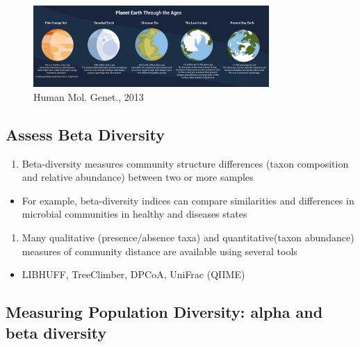 \documentclass[
]{book}
\providecommand{\tightlist}{%
  \setlength{\itemsep}{0pt}\setlength{\parskip}{0pt}}
\begin{document}
\begin{figure}
\centering
\includegraphics[width=0.8\textwidth,height=\textheight]{./Figures/Planets.png}
\caption{Human Mol. Genet., 2013}
\end{figure}

\hypertarget{assess-beta-diversity}{%
\subsection{Assess Beta Diversity}\label{assess-beta-diversity}}

\begin{enumerate}
\def\labelenumi{\arabic{enumi}.}
\tightlist
\item
  Beta-diversity measures community structure differences (taxon composition and relative abundance) between two or more samples
\end{enumerate}

\begin{itemize}
\tightlist
\item
  For example, beta-diversity indices can compare similarities and differences in microbial communities in healthy and diseases states
\end{itemize}

\begin{enumerate}
\def\labelenumi{\arabic{enumi}.}
\setcounter{enumi}{1}
\tightlist
\item
  Many qualitative (presence/absence taxa) and
  quantitative(taxon abundance) measures of community
  distance are available using several tools
\end{enumerate}

\begin{itemize}
\tightlist
\item
  LIBHUFF, TreeClimber, DPCoA, UniFrac (QIIME)
\end{itemize}

\hypertarget{measuring-population-diversity-alpha-and-beta-diversity}{%
\subsection{\texorpdfstring{Measuring Population Diversity: \textbf{alpha and beta diversity}}{Measuring Population Diversity: alpha and beta diversity}}\label{measuring-population-diversity-alpha-and-beta-diversity}}
\end{document}
